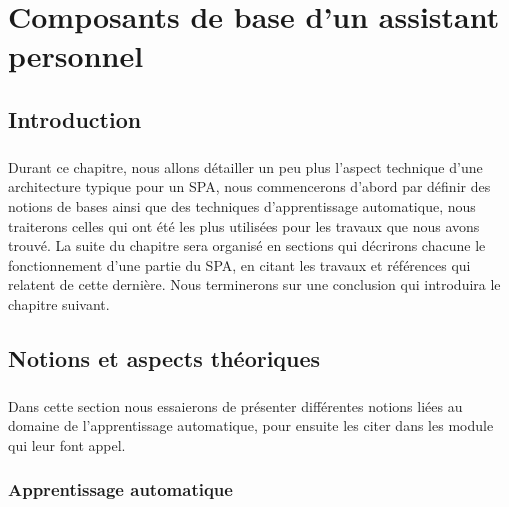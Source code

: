 \chapter{Composants de base d'un assistant personnel}

\section{Introduction}
	\paragraph{}
	Durant ce chapitre, nous allons détailler un peu plus l'aspect technique d'une architecture typique pour un SPA, nous commencerons d'abord par définir des notions de bases ainsi que des techniques d'apprentissage automatique, nous traiterons celles qui ont été les plus utilisées pour les travaux que nous avons trouvé. La suite du chapitre sera organisé en sections qui décrirons chacune le fonctionnement d'une partie du SPA, en citant les travaux et références qui relatent de cette dernière. Nous terminerons sur une conclusion qui introduira le chapitre suivant.
\section{Notions et aspects théoriques}
	\paragraph{}
	Dans cette section nous essaierons de présenter différentes notions liées au domaine de l'apprentissage automatique, pour ensuite les citer dans les module qui leur font appel. 
	\subsection{Apprentissage automatique}
